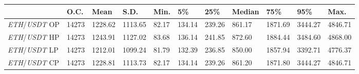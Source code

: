 \begin{tabular}{lllllllllll}
\toprule
 & \textbf{O.C.} & \textbf{Mean} & \textbf{S.D.} & \textbf{Min.} & \textbf{5\%} & \textbf{25\%} & \textbf{Median} & \textbf{75\%} & \textbf{95\%} & \textbf{Max.} \\
\midrule
\emph{ETH}/\emph{USDT} OP & 14273 & 1228.62 & 1113.65 & 82.17 & 134.14 & 239.26 & 861.17 & 1871.69 & 3444.27 & 4846.71 \\
\emph{ETH}/\emph{USDT} HP & 14273 & 1243.91 & 1127.02 & 83.68 & 136.14 & 241.85 & 872.60 & 1884.44 & 3484.60 & 4868.00 \\
\emph{ETH}/\emph{USDT} LP & 14273 & 1212.01 & 1099.24 & 81.79 & 132.39 & 236.85 & 850.00 & 1857.94 & 3392.71 & 4776.37 \\
\emph{ETH}/\emph{USDT} CP & 14273 & 1228.81 & 1113.73 & 82.17 & 134.14 & 239.26 & 861.20 & 1871.80 & 3444.27 & 4846.71 \\
\bottomrule
\end{tabular}
